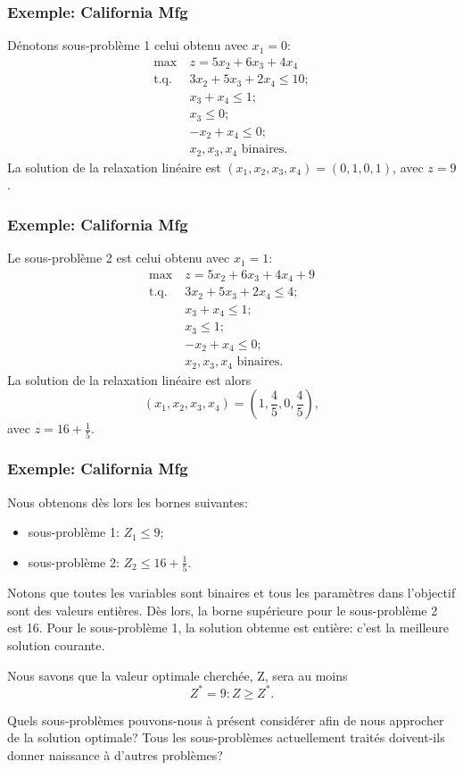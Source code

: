 \documentclass[usepdftitle=false]{beamer}
\def\st{\mbox{t.q. }}
\begin{document}
\begin{frame}
\frametitle{Exemple: California Mfg}

Dénotons sous-problème 1 celui obtenu avec $x_1 = 0$:
\begin{align*}
\max\ & z = 5x_2 + 6x_3 + 4x_4 \\
\st & 3x_2 + 5x_3 + 2x_4 \leq 10; \\
& x_3 + x_4 \leq 1; \\
& x_3 \leq 0; \\
& -x_2 + x_4 \leq 0; \\
& x_2, x_3, x_4 \mbox{ binaires}.
\end{align*}
La solution de la relaxation linéaire est $(x_1, x_2, x_3, x_4) = (0,1,0,1)$, avec $z = 9$.

\end{frame}

\begin{frame}
\frametitle{Exemple: California Mfg}

Le sous-problème 2 est celui obtenu avec $x_1 = 1$:
\begin{align*}
\max\ & z = 5x_2 + 6x_3 + 4x_4 + 9 \\
\st & 3x_2 + 5x_3 + 2x_4 \leq 4; \\
& x_3 + x_4 \leq 1; \\
& x_3 \leq 1; \\
& -x_2 + x_4 \leq 0; \\
& x_2, x_3, x_4 \mbox{ binaires}.
\end{align*}
La solution de la relaxation linéaire est alors
\[
(x_1, x_2, x_3, x_4) = \left( 1, \frac{4}{5},0, \frac{4}{5} \right),
\]
avec $z = 16+\frac{1}{5}$.

\end{frame}

\begin{frame}
\frametitle{Exemple: California Mfg}

Nous obtenons dès lors les bornes suivantes:
\begin{itemize}
\item
sous-problème 1: $Z_1 \leq 9$;
\item
sous-problème 2: $Z_2 \leq 16+\frac{1}{5}$.
\end{itemize}

\mbox{}

Notons que toutes les variables sont binaires et tous les paramètres dans l'objectif sont des valeurs entières.
Dès lors, la borne supérieure pour le sous-problème 2 est 16.
Pour le sous-problème 1, la solution obtenue est entière: c'est la meilleure solution courante.

\mbox{}

Nous savons que la valeur optimale cherchée, Z, sera au moins
\[
Z^* = 9: Z \geq Z^*.
\]

Quels sous-problèmes pouvons-nous à présent considérer afin de nous approcher de la solution optimale? Tous les sous-problèmes actuellement traités doivent-ils donner naissance à d'autres problèmes?

\end{frame}
\end{document}

